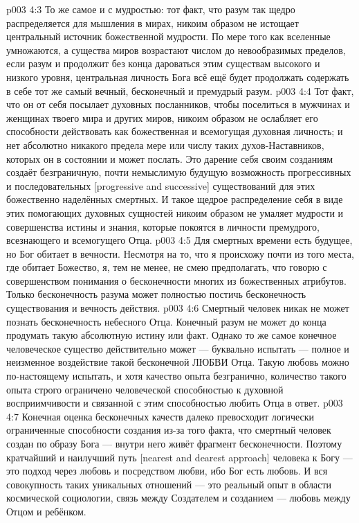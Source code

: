 \vs p003 4:3 То же самое и с мудростью: тот факт, что разум так щедро распределяется для мышления в мирах, никоим образом не истощает центральный источник божественной мудрости. По мере того как вселенные умножаются, а существа миров возрастают числом до невообразимых пределов, если разум и продолжит без конца дароваться этим существам высокого и низкого уровня, центральная личность Бога всё ещё будет продолжать содержать в себе тот же самый вечный, бесконечный и премудрый разум.
\vs p003 4:4 Тот факт, что он от себя посылает духовных посланников, чтобы поселиться в мужчинах и женщинах твоего мира и других миров, никоим образом не ослабляет его способности действовать как божественная и всемогущая духовная личность; и нет абсолютно никакого предела мере или числу таких духов\hyp{}Наставников, которых он в состоянии и может послать. Это дарение себя своим созданиям создаёт безграничную, почти немыслимую будущую возможность прогрессивных и последовательных [progressive and successive] существований для этих божественно наделённых смертных. И такое щедрое распределение себя в виде этих помогающих духовных сущностей никоим образом не умаляет мудрости и совершенства истины и знания, которые покоятся в личности премудрого, всезнающего и всемогущего Отца.
\vs p003 4:5 \pc Для смертных времени есть будущее, но Бог обитает в вечности. Несмотря на то, что я происхожу почти из того места, где обитает Божество, я, тем не менее, не смею предполагать, что говорю с совершенством понимания о бесконечности многих из божественных атрибутов. Только бесконечность разума может полностью постичь бесконечность существования и вечность действия.
\vs p003 4:6 \pc Смертный человек никак не может познать бесконечность небесного Отца. Конечный разум не может до конца продумать такую абсолютную истину или факт. Однако то же самое конечное человеческое существо действительно может  --- буквально испытать --- полное и неизменное воздействие такой бесконечной ЛЮБВИ Отца. Такую любовь можно по\hyp{}настоящему испытать, и хотя качество опыта безгранично, количество такого опыта строго ограничено человеческой способностью к духовной восприимчивости и связанной с этим способностью любить Отца в ответ.
\vs p003 4:7 Конечная оценка бесконечных качеств далеко превосходит логически ограниченные способности создания из\hyp{}за того факта, что смертный человек создан по образу Бога --- внутри него живёт фрагмент бесконечности. Поэтому кратчайший и наилучший путь [nearest and dearest approach] человека к Богу --- это подход через любовь и посредством любви, ибо Бог есть любовь. И вся совокупность таких уникальных отношений --- это реальный опыт в области космической социологии, связь между Создателем и созданием --- любовь между Отцом и ребёнком.
